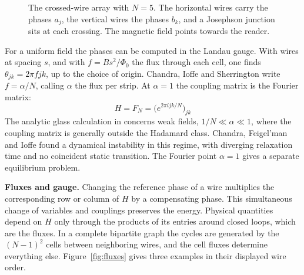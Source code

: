 \documentclass[11pt,a4paper]{article}
\theoremstyle{remark}
\begin{document}
\begin{figure}[htb!]
\centering
{}
\caption{The crossed-wire array with $N=5$. The horizontal wires carry the phases $a_j$, the vertical wires the phases $b_k$, and a Josephson junction sits at each crossing. The magnetic field points towards the reader.}\label{fig:array}
\end{figure}

For a uniform field the phases can be computed in the Landau gauge. With wires at spacing $s$, and with $f=Bs^2/\Phi_0$ the flux through each cell, one finds $\theta_{jk}=2\pi fjk$, up to the choice of origin. Chandra, Ioffe and Sherrington write $f=\alpha/N$, calling $\alpha$ the flux per strip. At $\alpha=1$ the coupling matrix is the Fourier matrix:
\[
 H=F_N=\big(e^{2\pi ijk/N}\big)_{jk}
\]
The analytic glass calculation in \cite{cis} concerns weak fields, $1/N\ll\alpha\ll1$, where the coupling matrix is generally outside the Hadamard class. Chandra, Feigel'man and Ioffe \cite{cfi} found a dynamical instability in this regime, with diverging relaxation time and no coincident static transition. The Fourier point $\alpha=1$ gives a separate equilibrium problem.

\medskip
\noindent\textbf{Fluxes and gauge.}
Changing the reference phase of a wire multiplies the corresponding row or column of $H$ by a compensating phase. This simultaneous change of variables and couplings preserves the energy. Physical quantities depend on $H$ only through the products of its entries around closed loops, which are the fluxes. In a complete bipartite graph the cycles are generated by the $(N-1)^2$ cells between neighboring wires, and the cell fluxes determine everything else. Figure~\ref{fig:fluxes} gives three examples in their displayed wire order.
\end{document}
